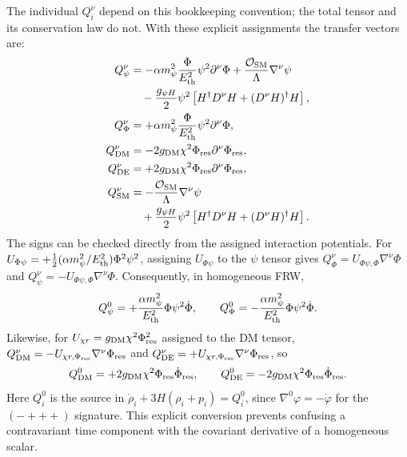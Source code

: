 \documentclass[epj]{svjour}
\begin{document}
The individual $Q_i^\nu$ depend on this bookkeeping convention;
the total tensor and its conservation law do not.
With these explicit assignments the transfer vectors are:
\begin{align}
Q_\psi^\nu &= -\alpha m_\psi^2 \frac{\Phi}{E_{\rm th}^2} \psi^2 \partial^\nu\Phi
 + \frac{\mathcal{O}_{\rm SM}}{\Lambda}\nabla^\nu\psi\nonumber\\
&\quad - \frac{g_{\psi H}}{2}\psi^2
 \left[H^\dagger D^\nu H+(D^\nu H)^\dagger H\right], \\
Q_\Phi^\nu &= +\alpha m_\psi^2 \frac{\Phi}{E_{\rm th}^2} \psi^2 \partial^\nu\Phi, \\
Q_{\rm DM}^\nu &= -2g_{\rm DM}\chi^2\Phi_{\rm res}\partial^\nu\Phi_{\rm res}, \\
Q_{\rm DE}^\nu &= +2g_{\rm DM}\chi^2\Phi_{\rm res}\partial^\nu\Phi_{\rm res}, \\
Q_{\rm SM}^\nu &= -\frac{\mathcal{O}_{\rm SM}}{\Lambda}\nabla^\nu\psi\nonumber\\
&\quad + \frac{g_{\psi H}}{2}\psi^2
 \left[H^\dagger D^\nu H+(D^\nu H)^\dagger H\right].
\end{align}
The signs can be checked directly from the assigned interaction
potentials. For
$U_{\Phi\psi}=+\tfrac12(\alpha m_\psi^2/E_{\rm th}^2)\Phi^2\psi^2$,
assigning $U_{\Phi\psi}$ to the $\psi$ tensor gives
$Q_\Phi^\nu=U_{\Phi\psi,\Phi}\nabla^\nu\Phi$ and
$Q_\psi^\nu=-U_{\Phi\psi,\Phi}\nabla^\nu\Phi$.
Consequently, in homogeneous FRW,
\begin{equation}
Q_\psi^0=+\frac{\alpha m_\psi^2}{E_{\rm th}^2}
\Phi\psi^2\dot\Phi,\qquad
Q_\Phi^0=-\frac{\alpha m_\psi^2}{E_{\rm th}^2}
\Phi\psi^2\dot\Phi.
\end{equation}
Likewise, for $U_{\chi r}=g_{\rm DM}\chi^2\Phi_{\rm res}^2$
assigned to the DM tensor,
$Q_{\rm DM}^\nu=-U_{\chi r,\Phi_{\rm res}}
\nabla^\nu\Phi_{\rm res}$ and
$Q_{\rm DE}^\nu=+U_{\chi r,\Phi_{\rm res}}
\nabla^\nu\Phi_{\rm res}$, so
\begin{equation}
Q_{\rm DM}^0=+2g_{\rm DM}\chi^2\Phi_{\rm res}
\dot\Phi_{\rm res},\qquad
Q_{\rm DE}^0=-2g_{\rm DM}\chi^2\Phi_{\rm res}
\dot\Phi_{\rm res}.
\end{equation}
Here $Q_i^0$ is the source in
$\dot\rho_i+3H(\rho_i+p_i)=Q_i^0$, since
$\nabla^0\varphi=-\dot\varphi$ for the $(-+++)$ signature.
This explicit conversion prevents confusing a contravariant time
component with the covariant derivative of a homogeneous scalar.
\end{document}
